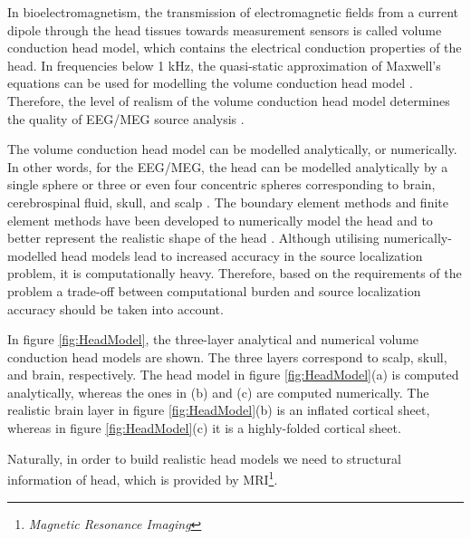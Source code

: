 In 
bioelectromagnetism, the transmission of electromagnetic fields from a current dipole through the head tissues towards measurement sensors is called volume conduction head model, which contains the electrical conduction properties of the head.
In frequencies below 1 kHz, the quasi-static approximation of Maxwell's equations can be used for modelling the volume conduction head model \cite{Plonsey1967}.
Therefore, the level of realism of the volume conduction head model determines the quality of EEG/MEG source analysis \cite{Haueisen2014}.

The volume conduction head model can be modelled analytically, 
or numerically.
In other words, for the EEG/MEG, the head can be modelled analytically by a single sphere or three or even four concentric spheres corresponding to brain, cerebrospinal fluid, skull, and scalp \cite{Hosek1978}.
The boundary element methods and finite element methods have been developed to numerically model the head and to better represent the realistic shape of the head \cite{Yan1991,Akalin-Acar2004}.
Although utilising numerically-modelled head models lead to increased accuracy in the source localization problem, it is computationally heavy.
Therefore, based on the requirements of the problem a trade-off between computational burden and source localization accuracy should be taken into account.

In figure \ref{fig:HeadModel}, the three-layer analytical and numerical volume conduction head models are shown.
The three layers correspond to scalp, skull, and brain, respectively.
The head model in figure \ref{fig:HeadModel}(a) is computed analytically, whereas the ones in (b) and (c) are computed numerically.
The realistic brain layer in figure \ref{fig:HeadModel}(b) is an inflated cortical sheet, whereas in figure \ref{fig:HeadModel}(c) it is a highly-folded cortical sheet.

Naturally, in order to build realistic head models we need to structural information of head, which is provided by MRI\footnote{\emph{Magnetic Resonance Imaging}}.

\FloatBarrier